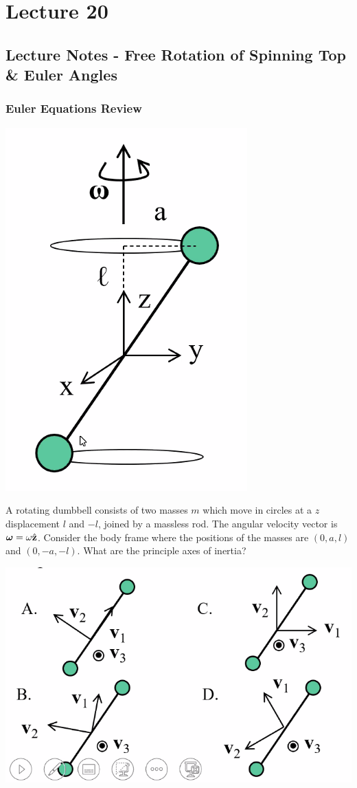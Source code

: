 \section{Lecture 20}
\subsection{Lecture Notes - Free Rotation of Spinning Top \& Euler Angles}
\subsubsection{Euler Equations Review}
\begin{center}
    \includegraphics[scale=0.5]{Lecture-20/l20-img1.png}
\end{center}
A rotating dumbbell consists of two masses $m$ which move in circles at a $z$ displacement $l$ and $-l$, joined by a massless rod. The angular velocity vector is $\bm{\omega} = \omega\hat{\mathbf{z}}$. Consider the body frame where the positions of the masses are $(0, a, l)$ and $(0, -a, -l)$. What are the principle axes of inertia?
\begin{center}
    \includegraphics[scale=0.5]{Lecture-20/l20-img2.png}
\end{center}

